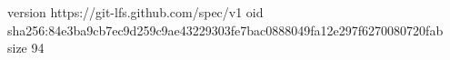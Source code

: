 version https://git-lfs.github.com/spec/v1
oid sha256:84e3ba9cb7ec9d259c9ae43229303fe7bac0888049fa12e297f6270080720fab
size 94
